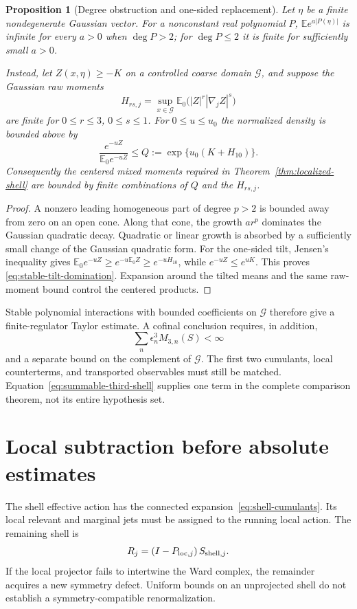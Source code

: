 \documentclass[11pt,a4paper,oneside]{book}
\theoremstyle{plain}
\newtheorem{proposition}[theorem]{Proposition}
\theoremstyle{definition}
\theoremstyle{remark}
\newcommand{\E}{\mathbb E}
\newcommand{\src}[2]{\cite{#1}}
\begin{document}
\begin{proposition}[Degree obstruction and one-sided replacement]
\label{prop:stable-polynomial-tilt}
Let $\eta$ be a finite nondegenerate Gaussian vector.  For a nonconstant
real polynomial $P$, $\E e^{a|P(\eta)|}$ is infinite for every $a>0$ when
$\deg P>2$; for $\deg P\le2$ it is finite for sufficiently small $a>0$.

Instead, let $Z(x,\eta)\ge-K$ on a controlled coarse domain
$\mathcal G$, and suppose the Gaussian raw moments
\[
 H_{rs,j}=\sup_{x\in\mathcal G}
          \E_0\bigl(|Z|^r|\nabla_jZ|^s\bigr)
\]
are finite for $0\le r\le3$, $0\le s\le1$.  For $0\le u\le u_0$ the
normalized density is bounded above by
\begin{equation}
 \frac{e^{-uZ}}{\E_0e^{-uZ}}
 \le Q:=\exp\{u_0(K+H_{10})\}.
 \label{eq:stable-tilt-domination}
\end{equation}
Consequently the centered mixed moments required in
Theorem~\ref{thm:localized-shell} are bounded by finite combinations of
$Q$ and the $H_{rs,j}$.
\end{proposition}
\begin{proof}
A nonzero leading homogeneous part of degree $p>2$ is bounded away from
zero on an open cone.  Along that cone, the growth $ar^p$ dominates the
Gaussian quadratic decay.  Quadratic or linear growth is absorbed by a
sufficiently small change of the Gaussian quadratic form.  For the
one-sided tilt, Jensen's inequality gives
$\E_0e^{-uZ}\ge e^{-u\E_0Z}\ge e^{-uH_{10}}$, while
$e^{-uZ}\le e^{uK}$.  This proves \eqref{eq:stable-tilt-domination}.
Expansion around the tilted means and the same raw-moment bound control
the centered products.
\end{proof}
\src{R17}{thm:v17v2-degree,lem:v17v2-tilt,thm:v17v2-one-sided,cor:v17v2-polynomial}

Stable polynomial interactions with bounded coefficients on $\mathcal G$
therefore give a finite-regulator Taylor estimate.  A cofinal conclusion
requires, in addition,
\begin{equation}
 \sum_n\epsilon_n^3M_{3,n}(S)<\infty
 \label{eq:summable-third-shell}
\end{equation}
and a separate bound on the complement of $\mathcal G$.  The first two
cumulants, local counterterms, and transported observables must still be
matched.  Equation~\eqref{eq:summable-third-shell} supplies one term in
the complete comparison theorem, not its entire hypothesis set.


\section{Local subtraction before absolute estimates}
The shell effective action has the connected expansion~\eqref{eq:shell-cumulants}. Its local relevant and marginal jets must be assigned to the running local action. The remaining shell is
\begin{equation}
 R_j=(I-P_{{\rm loc},j})\,S_{{\rm shell},j}.
 \label{eq:local-projector}
\end{equation}
If the local projector fails to intertwine the Ward complex, the remainder acquires a new symmetry defect. Uniform bounds on an unprojected shell do not establish a symmetry-compatible renormalization.
\end{document}
